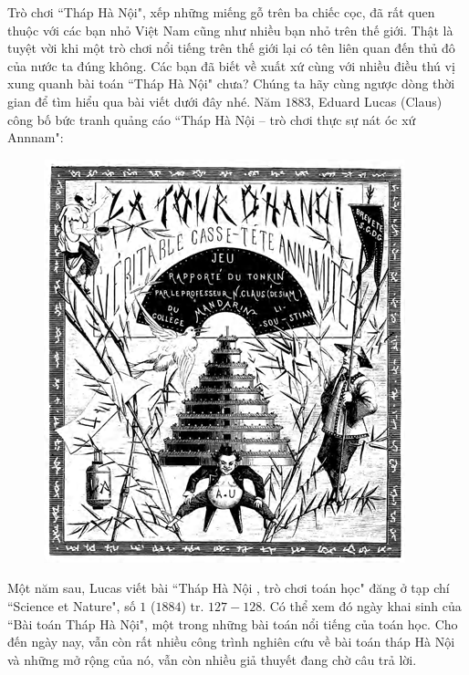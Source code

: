 \begin{multicols}{2}
	Trò chơi ``Tháp Hà Nội", xếp những miếng gỗ trên ba chiếc cọc, đã rất quen thuộc với các bạn nhỏ Việt Nam cũng như nhiều bạn nhỏ trên thế giới. Thật là tuyệt vời khi một trò chơi nổi tiếng trên thế giới lại có tên liên quan đến thủ đô của nước ta đúng không. Các bạn đã biết về xuất xứ cùng với nhiều điều thú vị xung quanh bài toán ``Tháp Hà Nội" chưa? Chúng ta hãy cùng ngược dòng thời gian để tìm hiểu qua bài viết dưới đây nhé.
	\vskip 0.1cm
	Năm $1883$, Eduard Lucas (Claus) công bố  bức tranh quảng cáo ``Tháp Hà Nội --  trò chơi thực sự nát óc xứ Annnam":
	\begin{figure}[H]
		\centering
		\vspace*{-5pt}
		\captionsetup{labelformat= empty, justification=centering}
		\includegraphics[width=1\linewidth]{1.1}
		\vspace*{-15pt}
	\end{figure}
	Một năm sau, Lucas viết bài ``Tháp Hà Nội , trò chơi toán học" đăng ở tạp chí ``Science et Nature", số $1$ ($1884$) tr. $127-128$. Có thể xem đó ngày khai sinh của ``Bài toán Tháp Hà Nội", một trong những bài toán nổi tiếng của toán học. Cho đến ngày nay, vẫn còn rất nhiều công trình nghiên cứu về bài toán tháp Hà Nội và những mở rộng của nó, vẫn còn nhiều giả thuyết đang chờ câu trả lời.

\end{multicols}
